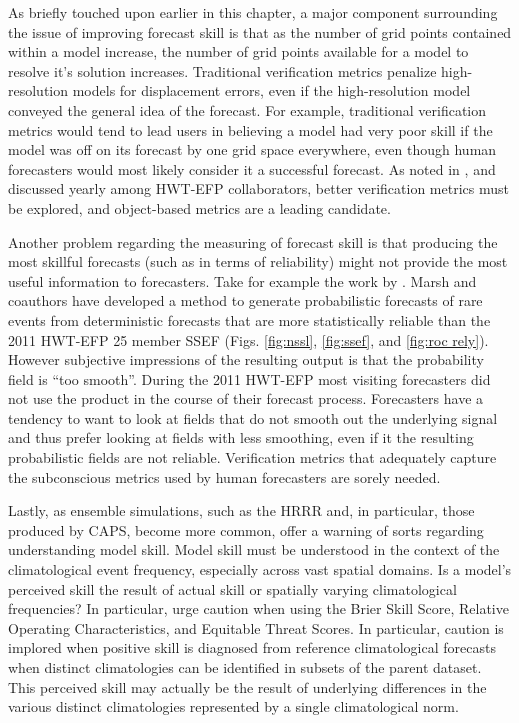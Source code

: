As briefly touched upon earlier in this chapter, a major component surrounding the issue of improving forecast skill is that as the number of grid points contained within a model increase, the number of grid points available for a model to resolve it's solution increases. Traditional verification metrics penalize high-resolution models for displacement errors, even if the high-resolution model conveyed the general idea of the forecast. For example, traditional verification metrics would tend to lead users in believing a model had very poor skill if the model was off on its forecast by one grid space everywhere, even though human forecasters would most likely consider it a successful forecast. As noted in \cite{clark2009comparison}, and discussed yearly among HWT-EFP collaborators, better verification metrics must be explored, and object-based metrics are a leading candidate.


Another problem regarding the measuring of forecast skill is that producing the most skillful forecasts (such as in terms of reliability) might not provide the most useful information to forecasters. Take for example the work by \cite{marsh2012calibration}. Marsh and coauthors have developed a method to generate probabilistic forecasts of rare events from deterministic forecasts that are more statistically reliable than the 2011 HWT-EFP 25 member SSEF (Figs. \ref{fig:nssl}, \ref{fig:ssef}, and \ref{fig:roc rely}). However subjective impressions of the resulting output is that the probability field is ``too smooth''. During the 2011 HWT-EFP most visiting forecasters did not use the product in the course of their forecast process.  Forecasters have a tendency to want to look at fields that do not smooth out the underlying signal and thus prefer looking at fields with less smoothing, even if it the resulting probabilistic fields are not reliable. Verification metrics that adequately capture the subconscious metrics used by human forecasters are sorely needed.


Lastly, as ensemble simulations, such as the HRRR and, in particular, those produced by CAPS, become more common, \cite{hamill2006trueskill} offer a warning of sorts regarding understanding model skill. Model skill must be understood in the context of the climatological event frequency, especially across vast spatial domains. Is a model's perceived skill the result of actual skill or spatially varying climatological frequencies? In particular, \cite{hamill2006trueskill} urge caution when using the Brier Skill Score, Relative Operating Characteristics, and Equitable Threat Scores. In particular, caution is implored when positive skill is diagnosed from reference climatological forecasts when distinct climatologies can be identified in subsets of the parent dataset. This perceived skill may actually be the result of underlying differences in the various distinct climatologies represented by a single climatological norm.



